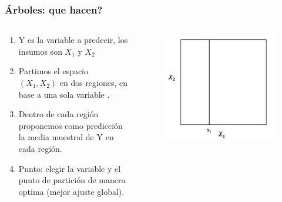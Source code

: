\documentclass[
  shownotes,
  xcolor={svgnames},
  hyperref={colorlinks,citecolor=DarkBlue,linkcolor=DarkRed,urlcolor=DarkBlue}
  , aspectratio=169]{beamer}
\begin{document}
\begin{frame}[fragile]
\frametitle{Árboles: que hacen?}


\begin{columns}[T] %
\begin{column}{.42\textwidth}
  
\begin{enumerate}
    \footnotesize
\item Y es la variable a predecir, los insumos son $X_1$ y $X_2$
\item  Partimos el espacio $(X_1,X_2)$ en dos regiones, en base a una sola variable .
\item Dentro de cada región proponemos como predicción la media muestral de Y en cada región.
\item Punto: elegir la variable y el punto de partición de manera optima (mejor ajuste global).
\end{enumerate}


\end{column}  
\hfill
\begin{column}{.48\textwidth}

 \begin{figure}[H] \centering
            \captionsetup{justification=centering}
              \includegraphics[scale=0.4]{figures/cart3}                           
 \end{figure}

\end{column}
\end{columns}

\end{frame}
\end{document}
